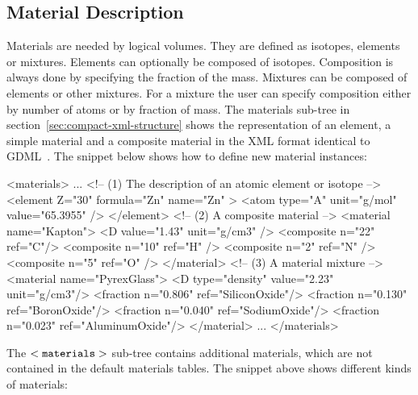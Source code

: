 \documentclass[10pt,a4paper]{article}
\begin{document}
\subsection{Material Description}
\label{sec:compact-material-description}
\noindent
Materials are needed by logical volumes. They are defined as isotopes, 
elements or mixtures.
Elements can optionally be composed of isotopes. Composition is always done 
by specifying the fraction of the mass. Mixtures can be composed of elements 
or other mixtures. For a mixture the user can specify composition either by 
number of atoms or by fraction of mass. The materials sub-tree 
in section~\ref{sec:compact-xml-structure}
shows the representation of an element, a simple material and a 
composite material in the XML format identical to GDML~\cite{bib:GDML}.
The snippet below shows how to define new material instances:
\begin{code}
<materials>
  ...
  <!-- (1) The description of an atomic element or isotope -->
  <element Z="30" formula="Zn" name="Zn" >
    <atom type="A" unit="g/mol" value="65.3955" />
  </element>
  <!-- (2) A composite material                            -->
  <material name="Kapton">
    <D value="1.43" unit="g/cm3" />
    <composite n="22" ref="C"/>
    <composite n="10" ref="H" />
    <composite n="2" ref="N" />
    <composite n="5" ref="O" />
  </material>
  <!-- (3) A material mixture                              -->
  <material name="PyrexGlass">
    <D type="density" value="2.23" unit="g/cm3"/>
    <fraction n="0.806" ref="SiliconOxide"/>
    <fraction n="0.130" ref="BoronOxide"/>
    <fraction n="0.040" ref="SodiumOxide"/>
    <fraction n="0.023" ref="AluminumOxide"/>
  </material>
  ...
</materials>
\end{code}
The $\tt<materials>$ sub-tree contains additional materials, which
are not contained in the default materials tables. The snippet above shows
different kinds of materials:
\end{document}

